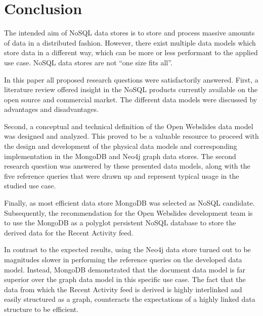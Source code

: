 
\chapter{Conclusion}
\label{ch:conclusion}


The intended aim of NoSQL data stores is to store and process massive amounts of data in a distributed fashion.
However, there exist multiple data models which store data in a different way, which can be more or less performant to the applied use case.
NoSQL data stores are not ``one size fits all''.

In this paper all proposed research questions were satisfactorily answered.
First, a literature review offered insight in the NoSQL products currently available on the open source and commercial market.
The different data models were discussed by advantages and disadvantages.

Second, a conceptual and technical definition of the Open Webslides data model was designed and analyzed.
This proved to be a valuable resource to proceed with the design and development of the physical data models and corresponding implementation in the MongoDB and Neo4j graph data stores.
The second research question was answered by these presented data models, along with the five reference queries that were drawn up and represent typical usage in the studied use case.

Finally, as most efficient data store MongoDB was selected as NoSQL candidate.
Subsequently, the recommendation for the Open Webslides development team is to use the MongoDB as a polyglot persistent NoSQL database to store the derived data for the Recent Activity feed.

In contrast to the expected results, using the Neo4j data store turned out to be magnitudes slower in performing the reference queries on the developed data model.
Instead, MongoDB demonstrated that the document data model is far superior over the graph data model in this specific use case.
The fact that the data from which the Recent Activity feed is derived is highly interlinked and easily structured as a graph, counteracts the expectations of a highly linked data structure to be efficient.

